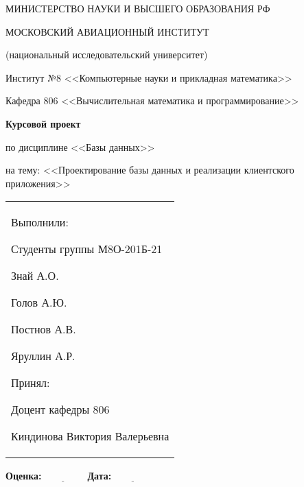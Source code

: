 	\begin{titlepage}
	\thispagestyle{specialfooter}
	
	\begin{center}
		МИНИСТЕРСТВО НАУКИ И ВЫСШЕГО ОБРАЗОВАНИЯ РФ
		
		\vspace{1cm}
		
		МОСКОВСКИЙ АВИАЦИОННЫЙ ИНСТИТУТ
		\par
		(национальный исследовательский университет)
		
		\vspace{1cm}
		
		Институт №8 <<Компьютерные науки и прикладная математика>>
		
		\par
		\vspace{1cm}
		
		Кафедра 806 <<Вычислительная математика и программирование>>
		
		\vfill
		
		{\Large \textbf{Курсовой проект}}
		\vspace{0.5cm}
		\par
		по дисциплине <<Базы данных>>
		\par
		на тему: <<Проектирование базы данных и реализации клиентского приложения>>
		
		\end{center}
		
		\vfill
		
		\begin{minipage}{0.45\textwidth}

		\end{minipage}%
		\hfill
		\begin{minipage}{0.5\textwidth}
			\begin{tabular}{p{\textwidth}}
				\raggedright 
				Выполнили:
				\par
				Студенты группы М8О-201Б-21
				\par
                Знай А.О.
                \par
				Голов А.Ю.
				\par
                Постнов А.В.
                \par
                Яруллин А.Р.
                \par
				\vspace{0.5cm}
				Принял:
				\par
				Доцент кафедры 806
				\par
				Киндинова Виктория Валерьевна
			\end{tabular}
		\end{minipage}
		
		\vspace{2cm}
		
		\textbf{Оценка:$\underline{\; \; \; \; \; \; \; \; \; \; \; \; \; \; \; \;}$} \hfill \textbf{Дата:$\underline{\; \; \; \; \; \; \; \; \; \; \; \; \; \; \; \;}$}
		
		
\end{titlepage}
